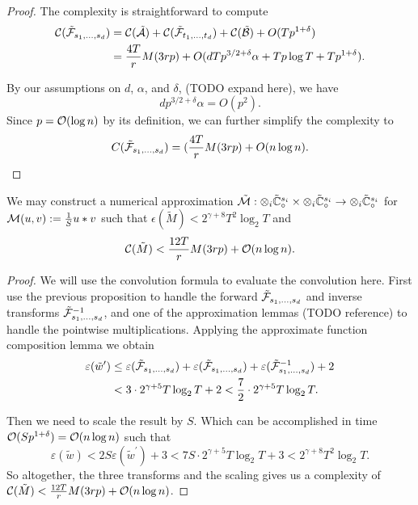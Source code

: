 \begin{proof}
    The complexity is straightforward to compute
    \begin{align*}
        \mathcal C(\tilde{\mathcal F}_{s_1, \ldots, s_d}) &= \mathcal C(\tilde{\mathcal A}) + \mathcal C(\tilde{\mathcal F}_{t_1, \ldots, t_d}) + \mathcal C(\tilde{\mathcal B}) + O(Tp^{1 + \delta})\\
                                                &= \frac{4T}{r}M(3rp) + O(dTp^{3/2 + \delta}\alpha + Tp\log T + Tp^{1 + \delta}).
    \end{align*}

    By our assumptions on $d$, $\alpha$, and $\delta$, (TODO expand here), we have
    \[
        dp^{3/2 + \delta}\alpha = O(p^2).
    \]
    Since $p = \mathcal O(\log n)$ by its definition, we can further simplify the complexity to
    \[
        C(\tilde{\mathcal F}_{s_1, \ldots, s_d}) = (\frac{4T}{r}M(3rp) + O(n \log n).
    \]
\end{proof}

\begin{proposition}
    We may construct a numerical approximation $\tilde{\mathcal M}: \otimes_i \tilde{{\mathbb C}}_\circ^{s_i} \times \otimes_i \tilde{{\mathbb C}}_\circ^{s_i} \to \otimes_i \tilde{{\mathbb C}}_\circ^{s_i}$ for $\mathcal M(u, v) := \frac{1}{S}u \ast v$ such that $\epsilon(\tilde{M}) < 2^{\gamma + 8}T^2 \log_2T$ and
    \[
        \mathcal C(\tilde{M}) < \frac{12T}{r} M(3rp) + \mathcal O(n \log n).
    \]
\end{proposition}

\begin{proof}
    We will use the convolution formula to evaluate the convolution here. First use the previous proposition to handle the forward $\tilde{\mathcal F}_{s_1, \ldots, s_d}$ and inverse transforms $\tilde{\mathcal F}_{s_1, \ldots, s_d}^{-1}$, and one of the approximation lemmas (TODO reference) to handle the pointwise multiplications. Applying the approximate function composition lemma we obtain
    \begin{align*}
        \varepsilon(\tilde{w}^\prime) &\leq \varepsilon(\tilde{\mathcal F}_{s_1, \ldots, s_d}) + \varepsilon(\tilde{\mathcal F}_{s_1, \ldots, s_d}) + \varepsilon(\tilde{\mathcal F}^{-1}_{s_1, \ldots, s_d}) + 2\\
                                      &< 3 \cdot 2^{\gamma + 5}T\log_2 T + 2 < \frac{7}{2} \cdot 2^{\gamma + 5}T \log_2 T.
    \end{align*}

    Then we need to scale the result by $S$. Which can be accomplished in time $\mathcal O(Sp^{1 + \delta}) = \mathcal O(n \log n)$ such that
    \[
        \varepsilon(\tilde{w}) < 2S\varepsilon(\tilde{w}^\prime) + 3 < 7S \cdot 2^{\gamma + 5} T \log_2 T + 3 < 2^{\gamma + 8}T^2 \log_2 T.
    \]
    So altogether, the three transforms and the scaling gives us a complexity of $\mathcal C(\tilde{M}) < \frac{12T}{r} M(3rp) + \mathcal O(n \log n)$.
\end{proof}


